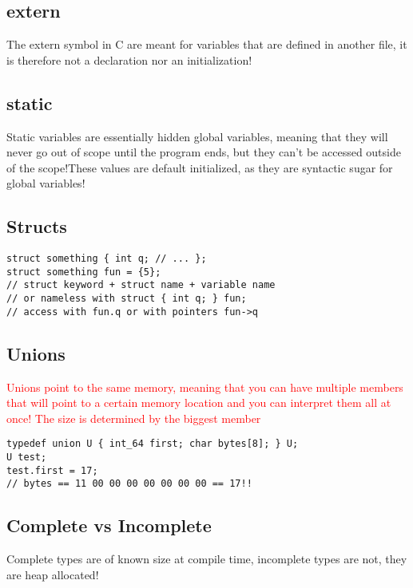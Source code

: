 \documentclass[main.tex,fontsize=8pt,paper=a4,paper=landscape,DIV=calc,]{scrartcl}
\begin{document}
\begin{multicols*}{4}
\subsection{extern}
The extern symbol in C are meant for variables that are defined in another file, it is therefore not a declaration nor an initialization!

\subsection{static}
Static variables are essentially hidden global variables, meaning that they will never go out of scope until the program ends, but they can't be accessed outside of the scope!These values are default initialized, as they are syntactic sugar for global variables!

\subsection{Structs}
\vspace{-2.5mm}
\begin{lstlisting}
struct something { int q; // ... };
struct something fun = {5};
// struct keyword + struct name + variable name
// or nameless with struct { int q; } fun;
// access with fun.q or with pointers fun->q
\end{lstlisting}
\vspace{2mm}

\subsection{Unions}
\textcolor{red}{Unions point to the same memory, meaning that you can have multiple members that will point to a certain memory location and you can interpret them all at once! The size is determined by the biggest member}
\vspace{-2.5mm}
\begin{lstlisting}
typedef union U { int_64 first; char bytes[8]; } U;
U test;
test.first = 17;
// bytes == 11 00 00 00 00 00 00 00 == 17!!
\end{lstlisting}
\vspace{2mm}

\subsection{Complete vs Incomplete}
Complete types are of known size at compile time, incomplete types are not, they are heap allocated!


\end{multicols*}
\end{document}
